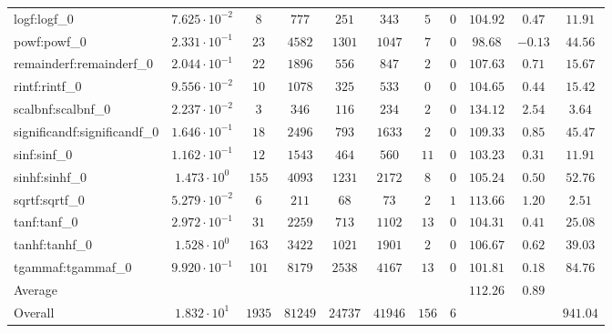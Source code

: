 \begin{tabular}{|l|c|c|c|c|c|c|c|c|c|c|}
logf:logf\_0                 & $ 7.625 \cdot 10^{-2} $ & $ 8      $ & $ 777   $ & $ 251   $ & $ 343   $ & $ 5   $ & $ 0 $ & $ 104.92      $ & $ 0.47    $ & $ 11.91   $ \\
powf:powf\_0                 & $ 2.331 \cdot 10^{-1} $ & $ 23     $ & $ 4582  $ & $ 1301  $ & $ 1047  $ & $ 7   $ & $ 0 $ & $ 98.68       $ & $ -0.13   $ & $ 44.56   $ \\
remainderf:remainderf\_0     & $ 2.044 \cdot 10^{-1} $ & $ 22     $ & $ 1896  $ & $ 556   $ & $ 847   $ & $ 2   $ & $ 0 $ & $ 107.63      $ & $ 0.71    $ & $ 15.67   $ \\
rintf:rintf\_0               & $ 9.556 \cdot 10^{-2} $ & $ 10     $ & $ 1078  $ & $ 325   $ & $ 533   $ & $ 0   $ & $ 0 $ & $ 104.65      $ & $ 0.44    $ & $ 15.42   $ \\
scalbnf:scalbnf\_0           & $ 2.237 \cdot 10^{-2} $ & $ 3      $ & $ 346   $ & $ 116   $ & $ 234   $ & $ 2   $ & $ 0 $ & $ 134.12      $ & $ 2.54    $ & $ 3.64    $ \\
significandf:significandf\_0 & $ 1.646 \cdot 10^{-1} $ & $ 18     $ & $ 2496  $ & $ 793   $ & $ 1633  $ & $ 2   $ & $ 0 $ & $ 109.33      $ & $ 0.85    $ & $ 45.47   $ \\
sinf:sinf\_0                 & $ 1.162 \cdot 10^{-1} $ & $ 12     $ & $ 1543  $ & $ 464   $ & $ 560   $ & $ 11  $ & $ 0 $ & $ 103.23      $ & $ 0.31    $ & $ 11.91   $ \\
sinhf:sinhf\_0               & $ 1.473 \cdot 10^{0}  $ & $ 155    $ & $ 4093  $ & $ 1231  $ & $ 2172  $ & $ 8   $ & $ 0 $ & $ 105.24      $ & $ 0.50    $ & $ 52.76   $ \\
sqrtf:sqrtf\_0               & $ 5.279 \cdot 10^{-2} $ & $ 6      $ & $ 211   $ & $ 68    $ & $ 73    $ & $ 2   $ & $ 1 $ & $ 113.66      $ & $ 1.20    $ & $ 2.51    $ \\
tanf:tanf\_0                 & $ 2.972 \cdot 10^{-1} $ & $ 31     $ & $ 2259  $ & $ 713   $ & $ 1102  $ & $ 13  $ & $ 0 $ & $ 104.31      $ & $ 0.41    $ & $ 25.08   $ \\
tanhf:tanhf\_0               & $ 1.528 \cdot 10^{0}  $ & $ 163    $ & $ 3422  $ & $ 1021  $ & $ 1901  $ & $ 2   $ & $ 0 $ & $ 106.67      $ & $ 0.62    $ & $ 39.03   $ \\
tgammaf:tgammaf\_0           & $ 9.920 \cdot 10^{-1} $ & $ 101    $ & $ 8179  $ & $ 2538  $ & $ 4167  $ & $ 13  $ & $ 0 $ & $ 101.81      $ & $ 0.18    $ & $ 84.76   $ \\
\hline
Average                      & $                     $ & $        $ & $       $ & $       $ & $       $ & $     $ & $   $ & $ 112.26      $ & $ 0.89    $ & $         $ \\
\hline
Overall                      & $ 1.832 \cdot 10^{1}  $ & $ 1935   $ & $ 81249 $ & $ 24737 $ & $ 41946 $ & $ 156 $ & $ 6 $ & $             $ & $         $ & $ 941.04  $ \\
\hline
\end{tabular}
